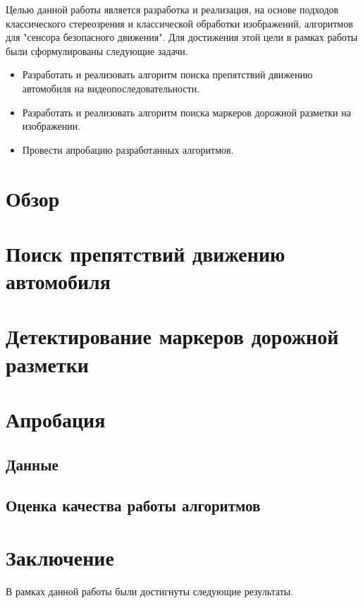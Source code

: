 \documentclass[aps,%
14pt,%
final,%
oneside,
onecolumn,%
musixtex, %
superscriptaddress,%
centertags]{extarticle} %
\begin{document}
Целью данной работы является разработка и реализация, на основе подходов классического стереозрения и классической обработки изображений, алгоритмов для "сенсора безопасного движения".
Для достижения этой цели в рамках работы были сформулированы следующие задачи.
\begin{itemize}
    \item Разработать и реализовать алгоритм поиска препятствий движению автомобиля на видеопоследовательности.
    \item Разработать и реализовать алгоритм поиска маркеров дорожной разметки на изображении.
    \item Провести апробацию разработанных алгоритмов.
\end{itemize}

\section{Обзор}
\section {Поиск препятствий движению автомобиля }

\section{Детектирование маркеров дорожной разметки}

\section{Апробация}

\subsection{Данные}

\subsection{Оценка качества работы алгоритмов}

\section{Заключение}

В рамках данной работы были достигнуты следующие результаты.
\end{document}
